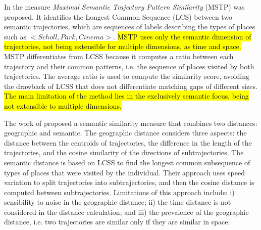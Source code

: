 \documentclass[12pt]{article}
\begin{document}
In \cite{Ying:2010:MUS:1867699.1867703} the measure \emph{Maximal Semantic Trajectory Pattern Similarity} (MSTP) was proposed. It identifies the Longest Common Sequence (LCS) between two semantic trajectories, which are sequences of labels describing the types of places such as $<Scholl, Park, Cinema>$. \hl{MSTP uses only the semantic dimension of trajectories, not being extensible for multiple dimensions, as time and space.} MSTP differentiates from LCSS because it computes a ratio between each trajectory and their common patterns, i.e. the sequence of places visited by both trajectories. The average ratio is used to compute the similarity score, avoiding the drawback of LCSS that does not differentiate matching gaps of different sizes. \hl{The main limitation of the method lies in the exclusively semantic focus, being not extensible to multiple dimensions.}





The work of \cite{Liu:2012:SMM:2442968.2442971} proposed a semantic similarity measure that combines two distances: geographic and semantic. The geographic distance considers three aspects: the distance between the centroids of trajectories, the difference in the length of the trajectories, and the cosine similarity of the directions of subtrajectories. The semantic distance is based on LCSS to find the longest common subsequence of types of places that were visited by the individual. Their approach uses speed variation to split trajectories into subtrajectories, and then the cosine distance is computed between subtrajectories. Limitations of this approach include: i) sensibility to noise in the geographic distance; ii) the time distance is not considered in the distance calculation; and iii) the prevalence of the geographic distance, i.e. two trajectories are similar only if they are similar in space.
\end{document}
